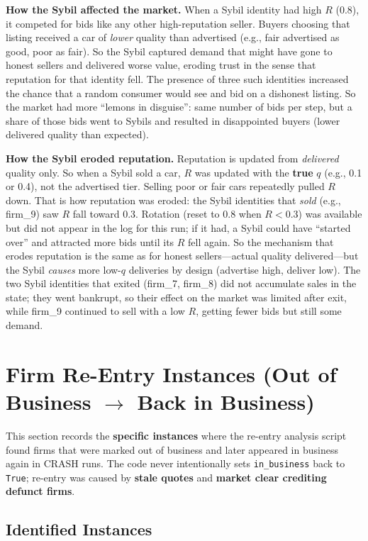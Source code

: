 \documentclass{article}
\begin{document}
\textbf{How the Sybil affected the market.} When a Sybil identity had high \(R\) (0.8), it competed for bids like any other high-reputation seller. Buyers choosing that listing received a car of \emph{lower} quality than advertised (e.g., fair advertised as good, poor as fair). So the Sybil captured demand that might have gone to honest sellers and delivered worse value, eroding trust in the sense that reputation for that identity fell. The presence of three such identities increased the chance that a random consumer would see and bid on a dishonest listing. So the market had more ``lemons in disguise'': same number of bids per step, but a share of those bids went to Sybils and resulted in disappointed buyers (lower delivered quality than expected).

\textbf{How the Sybil eroded reputation.} Reputation is updated from \emph{delivered} quality only. So when a Sybil sold a car, \(R\) was updated with the \textbf{true} \(q\) (e.g., 0.1 or 0.4), not the advertised tier. Selling poor or fair cars repeatedly pulled \(R\) down. That is how reputation was eroded: the Sybil identities that \emph{sold} (e.g., firm\_9) saw \(R\) fall toward 0.3. Rotation (reset to 0.8 when \(R < 0.3\)) was available but did not appear in the log for this run; if it had, a Sybil could have ``started over'' and attracted more bids until its \(R\) fell again. So the mechanism that erodes reputation is the same as for honest sellers---actual quality delivered---but the Sybil \emph{causes} more low-\(q\) deliveries by design (advertise high, deliver low). The two Sybil identities that exited (firm\_7, firm\_8) did not accumulate sales in the state; they went bankrupt, so their effect on the market was limited after exit, while firm\_9 continued to sell with a low \(R\), getting fewer bids but still some demand.

\section{Firm Re-Entry Instances (Out of Business \(\to\) Back in Business)}

This section records the \textbf{specific instances} where the re-entry analysis script found firms that were marked out of business and later appeared in business again in CRASH runs. The code never intentionally sets \texttt{in\_business} back to \texttt{True}; re-entry was caused by \textbf{stale quotes} and \textbf{market clear crediting defunct firms}.

\subsection{Identified Instances}
\end{document}
